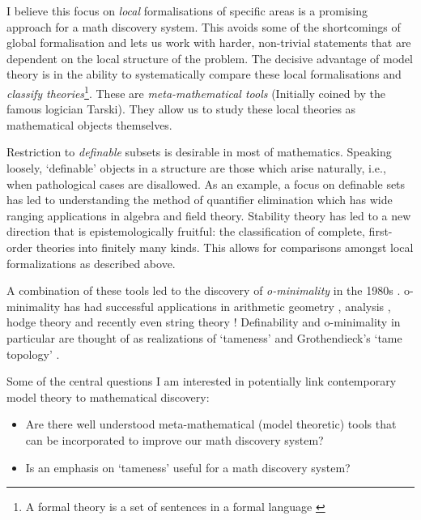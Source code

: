 I believe this focus on \textit{local} formalisations of specific areas is a promising approach for a math discovery system. This avoids some of the shortcomings of global formalisation and lets us work with harder, non-trivial statements that are dependent on the local structure of the problem. The decisive advantage of model theory is in the ability to systematically compare these local formalisations and \textit{classify theories}\footnote[3]{A formal theory is a set of sentences in a formal language \cite{changModelTheory1990}}.
These are \textit{meta-mathematical tools} (Initially coined by the famous logician Tarski). They allow us to study these local theories as mathematical objects themselves.
\par Restriction to \textit{definable} subsets is desirable in most of mathematics. Speaking loosely, `definable' objects in a structure are those which arise naturally, i.e., when pathological cases are disallowed. As an example, a focus on definable sets has led to understanding the method of quantifier elimination \cite{robinsonApplicationSymbolicLogic1952,TarskiDecisionMethod} which has wide ranging applications in algebra and field theory.
Stability theory has led to a  new direction that is epistemologically fruitful: the classification of complete, first-order theories into finitely many kinds. This allows for comparisons amongst local formalizations as described above.
\par A combination of these tools led to the discovery of \textit{o-minimality} in the 1980s \cite{pillayDefinableSetsOrdered1986, DENDRIES198497}. o-minimality has had successful applications in arithmetic geometry \cite{binyaminiWilkiesConjecturePfaffian2022,binyaminiBoundsRationalPoints2023}, analysis \cite{pilaOminimalityAndreOortConjecture2011}, hodge theory and recently even string theory \cite{douglasTamenessQuantumField2022,grimmComplexityTameQuantum2023,grimmFinitenessTheoremsCounting2023,grimmTamenessStringsDistance2022}!
Definability and o-minimality in particular are thought of as realizations of `tameness' and Grothendieck's `tame topology' \cite{acampoGrothendieckTameTopology2016, piekoszTameTopology2023}.
\par
Some of the central questions I am interested in potentially link contemporary model theory to mathematical discovery:
\begin{itemize}
    \item Are there well understood meta-mathematical (model theoretic) tools that can be incorporated to improve our math discovery system?
    \item Is an emphasis on `tameness' useful for a math discovery system?
\end{itemize}

